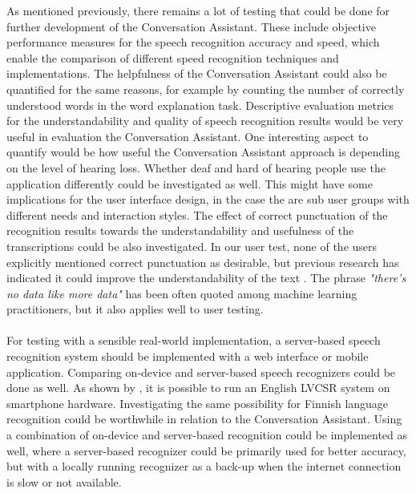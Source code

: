 \documentclass[english, 12pt, a4paper, pdftex, elec, utf8]{aaltothesis}
\begin{document}
As mentioned previously, there remains a lot of testing that could be done for further development of the Conversation Assistant. These include objective performance measures for the speech recognition accuracy and speed, which enable the comparison of different speed recognition techniques and implementations. The helpfulness of the Conversation Assistant could also be quantified for the same reasons, for example by counting the number of correctly understood words in the word explanation task. Descriptive evaluation metrics for the understandability and quality of speech recognition results would be very useful in evaluation the Conversation Assistant. One interesting aspect to quantify would be how useful the Conversation Assistant approach is depending on the level of hearing loss. Whether deaf and hard of hearing people use the application differently could be investigated as well. This might have some implications for the user interface design, in the case the are sub user groups with different needs and interaction styles. The effect of correct punctuation of the recognition results towards the understandability and usefulness of the transcriptions could be also investigated. In our user test, none of the users explicitly mentioned correct punctuation as desirable, but previous research has indicated it could improve the understandability of the text \cite{prietch2015application}. The phrase \textit{"there's no data like more data"} has been often quoted among machine learning practitioners, but it also applies well to user testing. \\\\
For testing with a sensible real-world implementation, a server-based speech recognition system should be implemented with a web interface or mobile application. Comparing on-device and server-based speech recognizers could be done as well. As shown by \cite{mcgraw2016personalized}, it is possible to run an English LVCSR system on smartphone hardware. Investigating the same possibility for Finnish language recognition could be worthwhile in relation to the Conversation Assistant. Using a combination of on-device and server-based recognition could be implemented as well, where a server-based recognizer could be primarily used for better accuracy, but with a locally running recognizer as a back-up when the internet connection is slow or not available. \\\\
\end{document}
